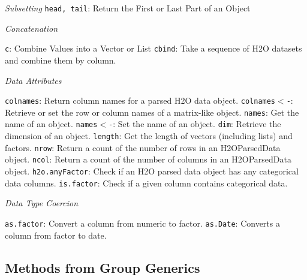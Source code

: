 \documentclass[11pt]{article}
\begin{document}
{{

\emph{Subsetting}\newline
{\texttt{head, tail}}: Return the First or Last Part of an Object\newline

\emph{Concatenation}\par
 {\texttt{c}}: Combine Values into a Vector or List\newline
 {\texttt{cbind}}: Take a sequence of H2O datasets and combine them by column.\par
{\emph{Data Attributes}}\par
{\texttt{colnames}}: Return column names for a parsed H2O data object. \newline
{\texttt{colnames$<$-}}: Retrieve or set the row or column names of a matrix-like object.\newline
{\texttt{names}}: Get the name of an object. \newline
{\texttt{names$<$-}}: Set the name of an object. \newline
{\texttt{dim}}: Retrieve the dimension of an object. \newline
{\texttt{length}}: Get the length of vectors (including lists) and factors. \newline
{\texttt{nrow}}: Return a count of the number of rows in an H2OParsedData object. \newline
{\texttt{ncol}}: Return a count of the number of columns in an H2OParsedData object.\newline
{\texttt{h2o.anyFactor}}: Check if an H2O parsed data object has any categorical data columns. \newline
{\texttt{is.factor}}: Check if a given column contains categorical data.\newline

{\emph{Data Type Coercion}}\par
{\texttt{as.factor}}: Convert a column from numeric to factor.\newline
{\texttt{as.Date}}: Converts a column from factor to date.\newline

\subsection{Methods from Group Generics}

}}
\end{document}
